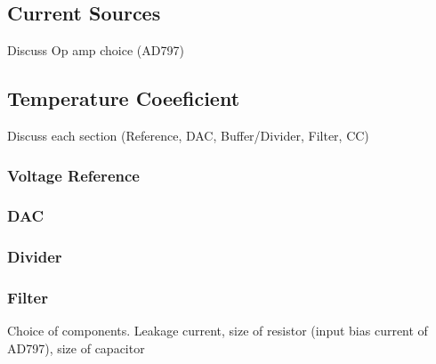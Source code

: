 \subsection{Current Sources}
Discuss Op amp choice (AD797)

\subsection{Temperature Coeeficient}
Discuss each section (Reference, DAC, Buffer/Divider, Filter, CC)
\subsubsection{Voltage Reference}
\subsubsection{DAC}
\subsubsection{Divider}
\subsubsection{Filter}
Choice of components. Leakage current, size of resistor (input bias current of AD797), size of capacitor
